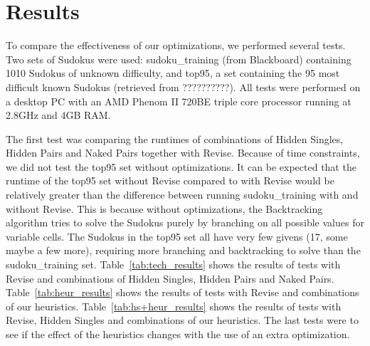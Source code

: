\documentclass[11pt]{article} %
\begin{document}
\section{Results}

To compare the effectiveness of our optimizations, we performed several tests. Two sets of Sudokus were used: sudoku\_training (from Blackboard) containing 1010 Sudokus of unknown difficulty, and top95, a set containing the 95 most difficult known Sudokus (retrieved from ??????????). All tests were performed on a desktop PC with an AMD Phenom II 720BE triple core processor running at 2.8GHz and 4GB RAM.

The first test was comparing the runtimes of combinations of Hidden Singles, Hidden Pairs and Naked Pairs together with Revise. Because of time constraints, we did not test the top95 set without optimizations. It can be expected that the runtime of the top95 set without Revise compared to with Revise would be relatively greater than the difference between running sudoku\_training with and without Revise. This is because without optimizations, the Backtracking algorithm tries to solve the Sudokus purely by branching on all possible values for variable cells. The Sudokus in the top95 set all have very few givens (17, some maybe a few more), requiring more branching and backtracking to solve than the sudoku\_training set.
Table~\ref{tab:tech_results} shows the results of tests with Revise and combinations of Hidden Singles, Hidden Pairs and Naked Pairs. Table~\ref{tab:heur_results} shows the results of tests with Revise and combinations of our heuristics. Table~\ref{tab:hs+heur_results} shows the results of tests with Revise, Hidden Singles and combinations of our heuristics. The last tests were to see if the effect of the heuristics changes with the use of an extra optimization.
\end{document}

